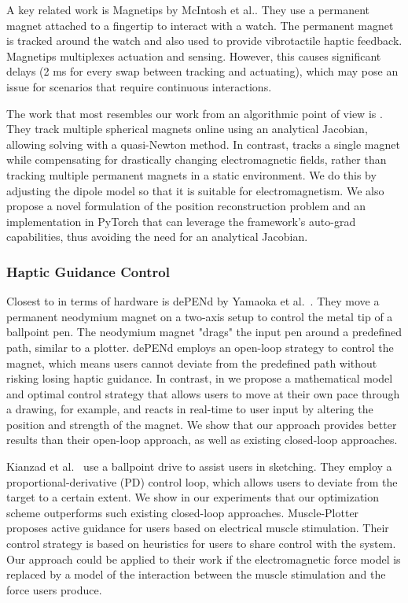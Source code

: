 A key related work is Magnetips by McIntosh et al.\cite{McIntosh2019}. They use a permanent magnet attached to a fingertip to interact with a watch. The permanent magnet is tracked around the watch and also used to provide vibrotactile haptic feedback. Magnetips multiplexes actuation and sensing. However, this causes significant delays (2 ms for every swap between tracking and actuating), which may pose an issue for scenarios that require continuous interactions.

The work that most resembles our work from an algorithmic point of view is \cite{taylor2019low}. They track multiple spherical magnets online using an analytical Jacobian, allowing solving with a quasi-Newton method. In contrast, \omniUIST tracks a single magnet while compensating for drastically changing electromagnetic fields, rather than tracking multiple permanent magnets in a static environment. We do this by adjusting the dipole model so that it is suitable for electromagnetism. We also propose a novel formulation of the position reconstruction problem and an implementation in PyTorch that can leverage the framework's auto-grad capabilities, thus avoiding the need for an analytical Jacobian.

\subsubsection{Haptic Guidance Control}
Closest to \magpen in terms of hardware is dePENd by Yamaoka et al.~\cite{yamaoka2013depend}.
They move a permanent neodymium magnet on a two-axis setup to control the metal tip of a ballpoint pen. The neodymium magnet "drags" the input pen around a predefined path, similar to a plotter. dePENd employs an open-loop strategy to control the magnet, which means users cannot deviate from the predefined path without risking losing haptic guidance. In contrast, in \magpen we propose a mathematical model and optimal control strategy that allows users to move at their own pace through a drawing, for example, and reacts in real-time to user input by altering the position and strength of the magnet. We show that our approach provides better results than their open-loop approach, as well as existing closed-loop approaches.

Kianzad et al.~\cite{Kianzad20} use a ballpoint drive to assist users in sketching. They employ a proportional-derivative (PD) control loop, which allows users to deviate from the target to a certain extent. We show in our experiments that our optimization scheme outperforms such existing closed-loop approaches. Muscle-Plotter \cite{Lopes16} proposes active guidance for users based on electrical muscle stimulation. Their control strategy is based on heuristics for users to share control with the system. Our approach could be applied to their work if the electromagnetic force model is replaced by a model of the interaction between the muscle stimulation and the force users produce.


